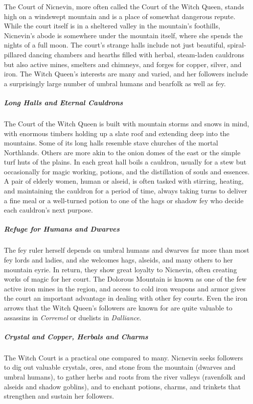 \documentclass[10pt,a4paper,twoside,bg=print,twocolumn,openany,nodeprecatedcode]{dndbook}
\begin{document}
The Court of Nicnevin, more often called the Court of the Witch Queen, stands high on a windswept mountain and is a place of somewhat dangerous repute. While the court itself is in a sheltered valley in the mountain's foothills, Nicnevin's abode is somewhere under the mountain itself, where she spends the nights of a full moon. The court's strange halls include not just beautiful, spiral-pillared dancing chambers and hearths filled with herbal, steam-laden cauldrons but also active mines, smelters and chimneys, and forges for copper, silver, and iron. The Witch Queen's interests are many and varied, and her followers include a surprisingly large number of umbral humans and bearfolk as well as fey.

\subparagraph{Long Halls and Eternal Cauldrons}
The Court of the Witch Queen is built with mountain storms and snows in mind, with enormous timbers holding up a slate roof and extending deep into the mountains. Some of its long halls resemble stave churches of the mortal Northlands. Others are more akin to the onion domes of the east or the simple turf huts of the plains. In each great hall boils a cauldron, usually for a stew but occasionally for magic working, potions, and the distillation of souls and essences. A pair of elderly women, human or alseid, is often tasked with stirring, heating, and maintaining the cauldron for a period of time, always taking turns to deliver a fine meal or a well-turned potion to one of the hags or shadow fey who decide each cauldron's next purpose.

\subparagraph{Refuge for Humans and Dwarves}
The fey ruler herself depends on umbral humans and dwarves far more than most fey lords and ladies, and she welcomes hags, alseids, and many others to her mountain eyrie. In return, they show great loyalty to Nicnevin, often creating works of magic for her court. The Dolorous Mountain is known as one of the few active iron mines in the region, and access to cold iron weapons and armor gives the court an important advantage in dealing with other fey courts. Even the iron arrows that the Witch Queen's followers are known for are quite valuable to assassins in \textit{Corremel} or duelists in \textit{Dalliance}.

\subparagraph{Crystal and Copper, Herbals and Charms}
The Witch Court is a practical one compared to many. Nicnevin seeks followers to dig out valuable crystals, ores, and stone from the mountain (dwarves and umbral humans), to gather herbs and roots from the river valleys (ravenfolk and alseids and shadow goblins), and to enchant potions, charms, and trinkets that strengthen and sustain her followers.
\end{document}
